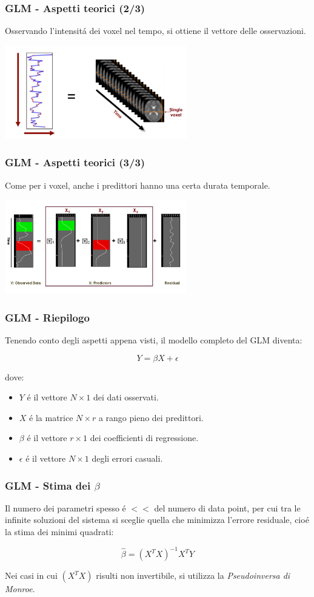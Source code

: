 \documentclass{beamer}
\begin{document}
\begin{frame}
\frametitle{GLM - Aspetti teorici (2/3)}
Osservando l'intensit\'a dei voxel nel tempo, si ottiene il \alert{vettore delle osservazioni}.

\includegraphics[keepaspectratio, width = 300px	]{Images/glm_matrix.png}
\end{frame}

\begin{frame}
\frametitle{GLM - Aspetti teorici (3/3)}
Come per i voxel, anche i predittori hanno una certa durata temporale.

\includegraphics[keepaspectratio, width = 300px]{Images/glm_visual.png}
\end{frame}

\begin{frame}
\frametitle{GLM - Riepilogo}
Tenendo conto degli aspetti appena visti, il modello completo del GLM diventa:

$$Y = \beta X + \epsilon$$

dove:
\begin{itemize}
\item $Y$ \'e il vettore $N \times 1 $ dei dati osservati.
\item $X$ \'e la matrice $N \times r$ a rango pieno dei predittori.
\item $\beta$ \'e il vettore $r \times 1$ dei coefficienti di regressione.
\item $\epsilon$ \'e il vettore $N \times 1$ degli errori casuali.
\end{itemize}
\end{frame}

\begin{frame}
\frametitle{GLM - Stima dei $\beta$}
Il numero dei parametri spesso \'e $<<$ del numero di data point, per cui tra le infinite soluzioni del sistema si sceglie quella che minimizza l'errore residuale, cio\'e la \alert{stima dei minimi quadrati}:

$$ 	\hat{\beta} = (X^TX)^{-1} X^TY$$

Nei casi in cui $(X^TX)$ risulti non invertibile, si utilizza la \emph{Pseudoinversa di Monroe}.
\end{frame}
\end{document}
